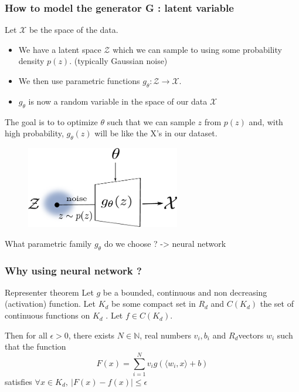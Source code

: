 \documentclass[french,9pt]{beamer}
\begin{document}
\begin{frame}
\frametitle{How to model the generator G : latent variable }

Let $\mathcal{X}$ be the space of the data. 
\begin{itemize}
\item We have a latent space $\mathcal{Z}$ which we can sample to using some probability density $p(z)$. (typically Gaussian noise)
\item  We then use parametric functions $g_{\theta} : \mathcal{Z} \rightarrow \mathcal{X}$.  
\item $g_{\theta}$ is now a random variable in the space of our data $\mathcal{X}$
\end{itemize}

The goal is to to optimize $\theta$ such that we can sample $z$ from $p(z)$ and, with high probability, $g_{\theta}(z)$ will be like the X’s in our dataset.

\begin{figure}
  \begin{center}
    \includegraphics[width=0.6\textwidth]{fig/latent.pdf}
  \end{center}
\end{figure}

\pause 
What parametric family $g_{\theta}$ do we choose ? -> neural network

\end{frame}


\begin{frame}
\frametitle{Why using neural network ?}

\begin{block}{Representer theorem}
Let $g$ be a bounded, continuous and non decreasing (activation) function. Let $K_{d}$ be some compact set in $R_{d}$ and $C(K_{d})$ the set of continuous functions on $K_{d}$ . Let $f \in C(K_{d})$. 

Then for all $\epsilon > 0$, there exists $N \in \mathbb{N}$, real numbers $v_{i}, b_{i}$ and $R_{d}$vectors $w_{i}$ such that the function
$$F(x) = \sum_{i=1}^{N} v_{i} g( \langle w_{i},x\rangle  +b)$$
satisfies
$\forall x \in K_{d}, \ | F(x) - f(x) | \leq \epsilon$

\end{block}
\end{frame}
\end{document}
